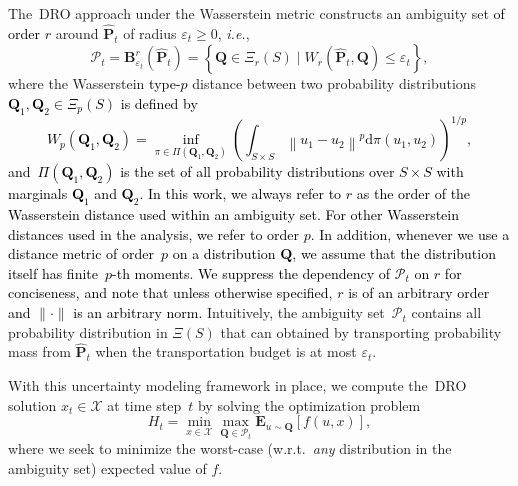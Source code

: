\documentclass[12pt]{article}
\newcommand{\ie}{{\it i.e.}}
\newcommand{\prob}{{\mathbf P}}
\newcommand{\supp}{S}
\newcommand{\unc}{u}
\newcommand{\epsnom}{\varepsilon}
\newcommand{\barp}{p}
\newcommand{\RC}[1]{\textcolor{black}{#1}}
\newcommand{\RC}[1]{\textcolor{blue}{#1}}
\begin{document}
 The~\gls{DRO} approach under the Wasserstein metric constructs an ambiguity set \RC{of order $r$} around $\hat{\prob}_t$ of radius $\epsnom_t \geq 0$, \ie,
\begin{equation}\label{empirical:ball}
\mathcal{P}_t = \mathbf{B}_{\epsnom_t}^r(\hat{\prob}_t)=\left\{\mathbf{Q} \in \Xi_{r}({\supp}) \mid W_r(\hat{\prob}_t, \mathbf{Q}) \leq \epsnom_t\right\},
\end{equation}
where the Wasserstein \RC{type-$\barp$} distance between two probability distributions \RC{$\mathbf{Q}_1, \mathbf{Q}_2 \in \Xi_{\barp}(\supp)$ is defined by
\begin{equation}
\label{def:wass}
W_{\barp}(\mathbf{Q}_1, \mathbf{Q}_2)=\inf _{\pi \in \Pi(\mathbf{Q}_1, \mathbf{Q}_2)} \left (\int_{\supp \times \supp} \left\|\unc_1-\unc_2\right\|^{\barp} \mathrm{d} \pi\left(\unc_1, \unc_2\right)\right)^{1/{\barp}},
\end{equation}
and~$\Pi(\mathbf{Q}_1, \mathbf{Q}_2)$ is the set of all probability distributions over $\supp \times \supp$ with marginals $\mathbf{Q}_1$ and $\mathbf{Q}_2$.} 
\RC{In this work, we always refer to $r$ as the order of the Wasserstein distance used within an ambiguity set. For other Wasserstein distances used in the analysis, we refer to order $p$.
In addition, whenever we use a distance metric of order~$p$ on a distribution $\mathbf{Q}$, we assume that the distribution itself has finite~$\barp$-th moments.}
\RC{We suppress the dependency of $\mathcal{P}_t$ on $r$ for conciseness, and note that unless otherwise specified, $r$ is of an arbitrary order and $\|\cdot\|$ is an arbitrary norm.}
Intuitively, the ambiguity set~$\mathcal{P}_t$ contains all probability distribution in $\Xi(\supp)$ that can obtained by transporting probability mass from $\hat{\prob}_t$ when the transportation budget is at most $\epsnom_t$. 

With this uncertainty modeling framework in place, we compute the~\gls{DRO} solution $x_t \in \mathcal{X}$ at time step~$t$ by solving the optimization problem
\begin{equation}\label{eq:DRO}
H_t = \min_{x \in \mathcal{X}} \max_{\mathbf{Q} \in \mathcal{P}_{t}}\mathbf{E}_{\unc \sim \mathbf{Q}}[f(\unc,x)],
\end{equation}
where we seek to minimize the worst-case (w.r.t.\ \textit{any} distribution in the ambiguity set) expected value of $f$. 
\end{document}
